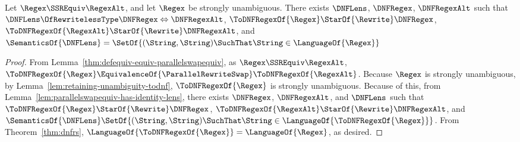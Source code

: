 \documentclass[sigplan,acmsmall]{acmart}
\begin{document}
\begin{lemma}
  \label{lem:identity-definitional-equivalence}
  Let $\Regex \SSREquiv \RegexAlt$, and let $\Regex$ be strongly
  unambiguous.  There exists $\DNFLens$, $\DNFRegex$, $\DNFRegexAlt$ such that
  $\DNFLens \OfRewritelessType \DNFRegex \Leftrightarrow \DNFRegexAlt$,
  $\ToDNFRegexOf{\Regex} \StarOf{\Rewrite} \DNFRegex$,
  $\ToDNFRegexOf{\RegexAlt} \StarOf{\Rewrite} \DNFRegexAlt$, and
  $\SemanticsOf{\DNFLens} =
  \SetOf{(\String,\String) \SuchThat \String\in\LanguageOf{\Regex}}$
\end{lemma}
\begin{proof}
  From Lemma~\ref{thm:defequiv-equiv-parallelswapequiv}, as 
  $\Regex \SSREquiv \RegexAlt$,
  $\ToDNFRegexOf{\Regex} \EquivalenceOf{\ParallelRewriteSwap}
  \ToDNFRegexOf{\RegexAlt}$.
  Because $\Regex$ is strongly unambiguous, by
  Lemma~\ref{lem:retaining-unambiguity-todnf}, $\ToDNFRegexOf{\Regex}$ is strongly
  unambiguous.
  Because of this, from Lemma~\ref{lem:parallelswapequiv-has-identity-lens},
  there exists $\DNFRegex$, $\DNFRegexAlt$, and $\DNFLens$ such that
  $\ToDNFRegexOf{\Regex} \StarOf{\Rewrite} \DNFRegex$,
  $\ToDNFRegexOf{\RegexAlt} \StarOf{\Rewrite} \DNFRegexAlt$, and
  $\SemanticsOf{\DNFLens} 
  \SetOf{(\String,\String) \SuchThat
    \String\in\LanguageOf{\ToDNFRegexOf{\Regex}}}$.
  From Theorem~\ref{thm:dnfrs}, $\LanguageOf{\ToDNFRegexOf{\Regex}} =
  \LanguageOf{\Regex}$, as desired.
\end{proof}
\end{document}
